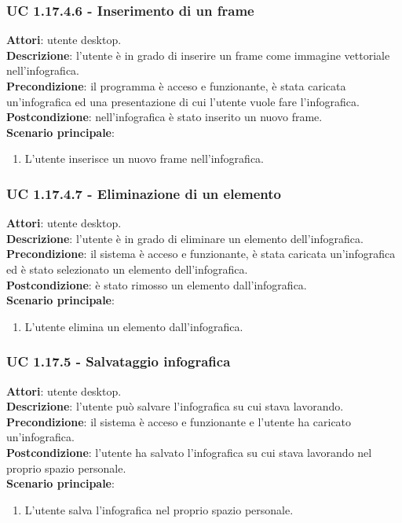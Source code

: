 \subsubsection{UC 1.17.4.6 - Inserimento di un frame}{
	\label{uc1.17.4.6}
	\textbf{Attori}: utente desktop. \\
	\textbf{Descrizione}: l'utente è in grado di inserire un frame come immagine vettoriale nell'infografica. \\
	\textbf{Precondizione}: il programma è acceso e funzionante, è stata caricata un'infografica ed una presentazione di cui l'utente vuole fare l'infografica.	\\
	\textbf{Postcondizione}: nell'infografica è stato inserito un nuovo frame.\\
	\textbf{Scenario principale}:
	\begin{enumerate}
		\item L'utente inserisce un nuovo frame nell'infografica.
	\end{enumerate}			
	}
\subsubsection{UC 1.17.4.7 - Eliminazione di un elemento}{
	\label{uc1.17.4.7}
	\textbf{Attori}: utente desktop. \\
	\textbf{Descrizione}: l'utente è in grado di eliminare un elemento dell'infografica. \\
	\textbf{Precondizione}: il sistema è acceso e funzionante, è stata caricata un'infografica ed è stato selezionato un elemento dell'infografica.	\\
	\textbf{Postcondizione}: è stato rimosso un elemento dall'infografica.\\
	\textbf{Scenario principale}:
	\begin{enumerate}
		\item L'utente elimina un elemento dall'infografica.
	\end{enumerate}			
	}
\subsubsection{UC 1.17.5 - Salvataggio infografica}{
	\label{uc1.17.5}
	\textbf{Attori}: utente desktop. \\
	\textbf{Descrizione}: l'utente può salvare l'infografica su cui stava lavorando. \\
	\textbf{Precondizione}: il sistema è acceso e funzionante e l'utente ha caricato un'infografica.	\\
	\textbf{Postcondizione}: l'utente ha salvato l’infografica su cui stava lavorando nel proprio spazio personale.\\
	\textbf{Scenario principale}:
	\begin{enumerate}
		\item L'utente salva l'infografica nel proprio spazio personale.
	\end{enumerate}			
	}
